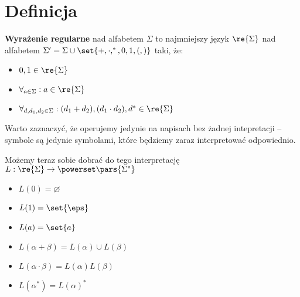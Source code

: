 \section{Definicja}
\begin{definition}
    \textbf{Wyrażenie regularne} nad alfabetem \( \Sigma \) to najmniejszy język \( \re{\Sigma} \) nad alfabetem \( \Sigma' = \Sigma \cup \set{+, \cdot, ^*, 0, 1, (, )} \) taki, że:
    \begin{itemize}
        \item \( 0, 1 \in \re{\Sigma} \)
        \item \( \forall_{a \in \Sigma}: a \in \re{\Sigma} \)
        \item \( \forall_{d, d_1, d_2 \in \Sigma}: (d_1 + d_2), (d_1 \cdot d_2), d^* \in \re{\Sigma} \)
    \end{itemize}
\end{definition}

Warto zaznaczyć, że operujemy jedynie na napisach bez żadnej intepretacji -- symbole są jedynie symbolami, które będziemy zaraz interpretować odpowiednio.

Możemy teraz sobie dobrać do tego interpretację \( L: \re{\Sigma} \rightarrow \powerset\pars{\Sigma^*} \)
\begin{itemize}
    \item \( L(0) = \varnothing \)
    \item \( L(1) = \set{\eps} \)
    \item \( L(a) = \set{a} \)
    \item \( L(\alpha + \beta) = L(\alpha) \cup L(\beta) \)
    \item \( L(\alpha \cdot \beta) = L(\alpha)L(\beta) \)
    \item \( L(\alpha^*) = L(\alpha)^* \)
\end{itemize}
